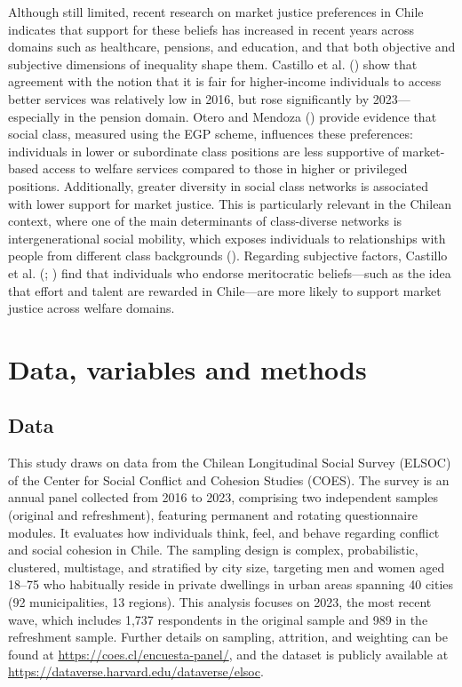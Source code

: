 \documentclass[
  13pt,
]{article}
\begin{document}
Although still limited, recent research on market justice preferences in
Chile indicates that support for these beliefs has increased in recent
years across domains such as healthcare, pensions, and education, and
that both objective and subjective dimensions of inequality shape them.
Castillo et al. () show
that agreement with the notion that it is fair for higher-income
individuals to access better services was relatively low in 2016, but
rose significantly by 2023---especially in the pension domain. Otero and
Mendoza () provide evidence that
social class, measured using the EGP scheme, influences these
preferences: individuals in lower or subordinate class positions are
less supportive of market-based access to welfare services compared to
those in higher or privileged positions. Additionally, greater diversity
in social class networks is associated with lower support for market
justice. This is particularly relevant in the Chilean context, where one
of the main determinants of class-diverse networks is intergenerational
social mobility, which exposes individuals to relationships with people
from different class backgrounds (). Regarding subjective factors, Castillo et al.
(; ) find that individuals who endorse meritocratic beliefs---such as
the idea that effort and talent are rewarded in Chile---are more likely
to support market justice across welfare domains.

\section{Data, variables and methods}\label{data-variables-and-methods}

\subsection{Data}\label{data}

This study draws on data from the Chilean Longitudinal Social Survey
(ELSOC) of the Center for Social Conflict and Cohesion Studies (COES).
The survey is an annual panel collected from 2016 to 2023, comprising
two independent samples (original and refreshment), featuring permanent
and rotating questionnaire modules. It evaluates how individuals think,
feel, and behave regarding conflict and social cohesion in Chile. The
sampling design is complex, probabilistic, clustered, multistage, and
stratified by city size, targeting men and women aged 18--75 who
habitually reside in private dwellings in urban areas spanning 40 cities
(92 municipalities, 13 regions). This analysis focuses on 2023, the most
recent wave, which includes 1,737 respondents in the original sample and
989 in the refreshment sample. Further details on sampling, attrition,
and weighting can be found at \url{https://coes.cl/encuesta-panel/}, and
the dataset is publicly available at
\url{https://dataverse.harvard.edu/dataverse/elsoc}.
\end{document}
